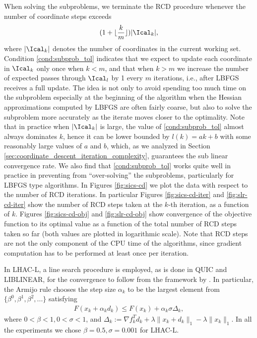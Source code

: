 \documentclass[11pt]{article}
\numberwithin{equation}{section}
\begin{document}
When solving the subproblems, we terminate the RCD procedure whenever the number of coordinate steps exceeds
\begin{align}        
\label{cond:subprob_tol}
     (1 + \lfloor \frac{k}{m} \rfloor ) |\Ical_k|,
 \end{align} 
where $|\Ical_k|$ denotes the number of coordinates in the current working set. Condition \eqref{cond:subprob_tol} indicates that we expect to update each coordinate in $\Ical_k$ only once when $k < m$, and that when $k > m$ we increase the number of expected passes through $\Ical_l$ by 1 every $m$ iterations, i.e., after LBFGS receives a full update. The idea is not only to avoid spending too much time on the subproblem especially at the beginning of the algorithm when the Hessian approximations computed by LBFGS are often fairly coarse, but also to solve the subproblem more accurately as the iterate moves closer to the optimality. Note that in practice when $|\Ical_k|$ is large, the value of  \eqref{cond:subprob_tol} almost always dominates $k$, hence it can be lower bounded by $l(k)=ak+b$ with some reasonably large values of $a$ and $b$, which, as we analyzed in Section \ref{sec:coordinate_descent_iteration_complexity},  guarantees the sub linear convergence rate. We also find that \eqref{cond:subprob_tol} works quite well in practice in preventing from ``over-solving'' the subproblems, particularly for LBFGS type algorithms. In Figures \ref{fig:sics-cd} we plot the data with respect to the number of RCD iterations. In particular Figures \ref{fig:sics-cd-iter} and \ref{fig:slr-cd-iter} show the number of RCD steps taken at the $k$-th iteration, as a function of  $k$. Figures \ref{fig:sics-cd-obj} and \ref{fig:slr-cd-obj} show convergence of the objective function to its optimal value as a function of the total number of RCD steps taken so far (both values are plotted in logarithmic scale). Note that RCD steps are not the only component of the CPU time of the algorithms, since gradient computation has to be performed at least once per iteration. 

In LHAC-L,  a line search procedure is employed, as is done  in QUIC and LIBLINEAR,   for the convergence  to follow from the framework by \cite{Tseng2009}. In particular, the Armijo rule chooses the step size $\alpha_k$ to be the largest element from $\{\beta^0, \beta^1, \beta^2, ... \}$ satisfying
\begin{align}
    \label{equ:line_search}
    F(x_k + \alpha_k d_k) \leq F(x_k) + \alpha_k \sigma \Delta_k,
\end{align} 
where $0 < \beta < 1, 0 < \sigma < 1$, and $\Delta_k := \nabla f_k^T d_k + \lambda \|x_k + d_k\|_1 - \lambda \|x_k\|_1$. In all the experiments we chose $\beta = 0.5, \sigma = 0.001$ for LHAC-L.
\end{document}
